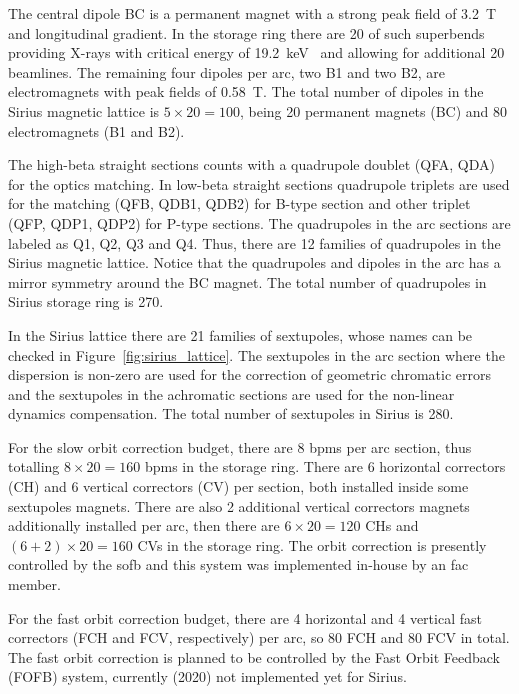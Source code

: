 The central dipole BC is a permanent magnet with a strong peak field of \SI{3.2}{\tesla} and longitudinal gradient. In the storage ring there are 20 of such superbends providing X-rays with critical energy of \SI{19.2}{\kilo\electronvolt}~\cite{Liu2016b} and allowing for additional 20 beamlines. The remaining four dipoles per arc, two B1 and two B2, are electromagnets with peak fields of \SI{0.58}{\tesla}. The total number of dipoles in the Sirius magnetic lattice is $5 \times 20 = 100$, being 20 permanent magnets (BC) and 80 electromagnets (B1 and B2).

The high-beta straight sections counts with a quadrupole doublet (QFA, QDA) for the optics matching. In low-beta straight sections quadrupole triplets are used for the matching (QFB, QDB1, QDB2) for B-type section and other triplet (QFP, QDP1, QDP2) for P-type sections. The quadrupoles in the arc sections are labeled as Q1, Q2, Q3 and Q4. Thus, there are 12 families of quadrupoles in the Sirius magnetic lattice. Notice that the quadrupoles and dipoles in the arc has a mirror symmetry around the BC magnet. The total number of quadrupoles in Sirius storage ring is 270. 

In the Sirius lattice there are 21 families of sextupoles, whose names can be checked in Figure~\ref{fig:sirius_lattice}. The sextupoles in the arc section where the dispersion is non-zero are used for the correction of geometric chromatic errors and the sextupoles in the achromatic sections are used for the non-linear dynamics compensation. The total number of sextupoles in Sirius is 280.

For the slow orbit correction budget, there are 8 \glspl{bpm} per arc section, thus totalling $8 \times 20 = 160$ \glspl{bpm} in the storage ring. There are 6 horizontal correctors (CH) and 6 vertical correctors (CV) per section, both installed inside some sextupoles magnets. There are also 2 additional vertical correctors magnets additionally installed per arc, then there are $6 \times 20 = 120$ CHs and $(6 + 2) \times 20 = 160$ CVs in the storage ring. The orbit correction is presently controlled by the \gls{sofb} and this system was implemented in-house by an \gls{fac} member.

For the fast orbit correction budget, there are 4 horizontal and 4 vertical fast correctors (FCH and FCV, respectively) per arc, so 80 FCH and 80 FCV in total. The fast orbit correction is planned to be controlled by the Fast Orbit Feedback (FOFB) system, currently (2020) not implemented yet for Sirius.

